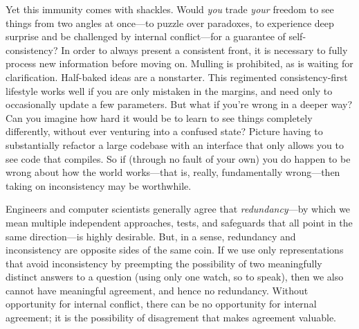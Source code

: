 Yet this immunity comes with shackles.
Would \emph{you} trade \emph{your} freedom to see things from two angles at once---to puzzle over paradoxes, to experience deep surprise and be challenged by internal conflict---for a guarantee of self-consistency?
%
In order to always present a consistent front, it is necessary to fully process new information before moving on. Mulling is prohibited, as
is waiting for clarification.
Half-baked ideas are a nonstarter.
This regimented consistency-first lifestyle works well if you are only mistaken in the margins, and need only to occasionally update a few parameters.
But what if you're wrong in a deeper way?
Can you imagine how hard it would be to learn to see things completely differently, without ever venturing into a confused state?
Picture having to substantially refactor a large codebase with an interface that only allows you to see code that compiles.
So if (through no fault of your own) you do happen to be wrong about how the world works---that is, really, fundamentally wrong---then taking on inconsistency may be worthwhile.


Engineers and computer scientists generally agree that \emph{redundancy}---by which we mean multiple independent approaches, tests, and safeguards that all point in the same direction---is highly desirable. 
But, in a sense, redundancy and inconsistency are opposite sides of the same coin. 
If we use only representations that avoid inconsistency 
by preempting the possibility of two meaningfully distinct answers to a question 
    (using only one watch, so to speak),
    then we also cannot have meaningful agreement, 
        and hence no redundancy. 
Without opportunity for internal conflict, there can be no opportunity for internal agreement; 
it is the possibility of disagrement that makes agreement valuable. 


